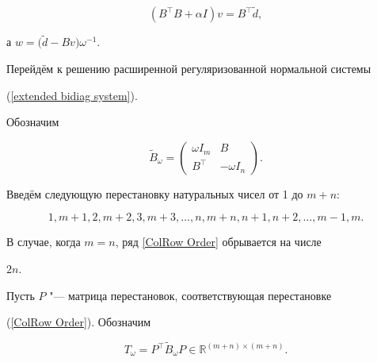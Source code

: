 \begin{equation}

\label{regularizationed system_Bidiag} \left( B^\top    B + \alpha I

\right) v = B^\top    \widetilde{d},

\end{equation}

а $w = \bigl( \widetilde{d} - B v \bigr) {\omega}^{-1}$.



Перейдём к решению расширенной регуляризованной нормальной системы

(\ref{extended bidiag system}). 

Обозначим

\begin{equation}

\label{extended bidiag matrix} \widetilde{B}_\omega = \left(

\begin{array}{cc}

{\omega I_m} & B \\

B^\top    & {-\omega I_n}

\end{array}

\right).

\end{equation}



Введём следующую перестановку натуральных чисел от 1 до $m+n$:

\begin{equation}

\label{ColRow Order} 1, m+1, 2, m+2, 3, m+3, \dots , n, m+n, n+1, n+2,

\dots, m-1, m.

\end{equation}

В случае, когда $m=n$, ряд \eqref{ColRow Order} обрывается на числе

$2n$.



Пусть $P$ "--- матрица перестановок, соответствующая перестановке

(\ref{ColRow Order}). Обозначим

\begin{equation}

\label{tridiag decomposition} T_{\omega} = P^\top   

\widetilde{B}_{\omega} P \in {\mathbb{R}}^{(m+n) \times (m+n)}.

\end{equation}


